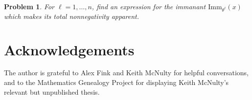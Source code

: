 \documentclass[12pt]{amsart}
\newtheorem{prob}[thm]{Problem}
\numberwithin{equation}{section}
\newcommand{\imm}[1]{\mathrm{Imm}_{#1}}
\newcommand{\bp}{\begin{prob}}
\newcommand{\ep}{\end{prob}}
\begin{document}
\bp For $\ell = 1,\dotsc, n$, find an expression for the
immanant $\imm{\theta^\ell}(x)$ which makes its
total nonnegativity apparent.
\ep


\section{Acknowledgements}

The author is grateful to Alex Fink
and Keith McNulty for helpful conversations,
and to
the Mathematics Genealogy Project
for displaying Keith McNulty's relevant but unpublished thesis.


\end{document}
